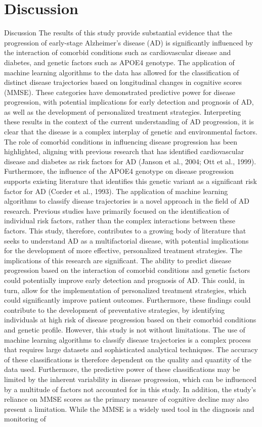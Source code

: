 \documentclass[conference]{IEEEtran}
\begin{document}
\section{Discussion}
Discussion The results of this study provide substantial evidence that the progression of early-stage Alzheimer's disease (AD) is significantly influenced by the interaction of comorbid conditions such as cardiovascular disease and diabetes, and genetic factors such as APOE4 genotype. The application of machine learning algorithms to the data has allowed for the classification of distinct disease trajectories based on longitudinal changes in cognitive scores (MMSE). These categories have demonstrated predictive power for disease progression, with potential implications for early detection and prognosis of AD, as well as the development of personalized treatment strategies. Interpreting these results in the context of the current understanding of AD progression, it is clear that the disease is a complex interplay of genetic and environmental factors. The role of comorbid conditions in influencing disease progression has been highlighted, aligning with previous research that has identified cardiovascular disease and diabetes as risk factors for AD (Janson et al., 2004; Ott et al., 1999). Furthermore, the influence of the APOE4 genotype on disease progression supports existing literature that identifies this genetic variant as a significant risk factor for AD (Corder et al., 1993). The application of machine learning algorithms to classify disease trajectories is a novel approach in the field of AD research. Previous studies have primarily focused on the identification of individual risk factors, rather than the complex interactions between these factors. This study, therefore, contributes to a growing body of literature that seeks to understand AD as a multifactorial disease, with potential implications for the development of more effective, personalized treatment strategies. The implications of this research are significant. The ability to predict disease progression based on the interaction of comorbid conditions and genetic factors could potentially improve early detection and prognosis of AD. This could, in turn, allow for the implementation of personalized treatment strategies, which could significantly improve patient outcomes. Furthermore, these findings could contribute to the development of preventative strategies, by identifying individuals at high risk of disease progression based on their comorbid conditions and genetic profile. However, this study is not without limitations. The use of machine learning algorithms to classify disease trajectories is a complex process that requires large datasets and sophisticated analytical techniques. The accuracy of these classifications is therefore dependent on the quality and quantity of the data used. Furthermore, the predictive power of these classifications may be limited by the inherent variability in disease progression, which can be influenced by a multitude of factors not accounted for in this study. In addition, the study's reliance on MMSE scores as the primary measure of cognitive decline may also present a limitation. While the MMSE is a widely used tool in the diagnosis and monitoring of 
\end{document}
